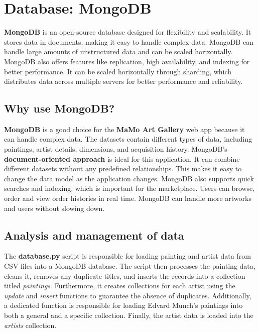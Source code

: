 \documentclass[a4paper,12pt]{article}
\begin{document}
\newpage
\section{Database: MongoDB}
\justify

\textbf{MongoDB} is an open-source database designed for flexibility and scalability. It stores data in documents, making it easy to handle complex data. MongoDB can handle large amounts of unstructured data and can be scaled horizontally. MongoDB also offers features like replication, high availability, and indexing for better performance. It can be scaled horizontally through sharding, which distributes data across multiple servers for better performance and reliability.


\subsection{Why use MongoDB?}
\justify
\textbf{MongoDB} is a good choice for the \textbf{MaMo Art Gallery} web app because it can handle complex data. The datasets contain different types of data, including paintings, artist details, dimensions, and acquisition history. MongoDB's \textbf{document-oriented approach} is ideal for this application. It can combine different datasets without any predefined relationships. This makes it easy to change the data model as the application changes.
MongoDB also supports quick searches and indexing, which is important for the marketplace. Users can browse, order and view order histories in real time. MongoDB can handle more artworks and users without slowing down.

\subsection{Analysis and management of data}
\justify

The \textbf{database.py} script is responsible for loading painting and artist data from CSV files into a MongoDB database. The script then processes the painting data, cleans it, removes any duplicate titles, and inserts the records into a collection titled \textit{paintings}. Furthermore, it creates collections for each artist using the \textit{update} and \textit{insert} functions to guarantee the absence of duplicates. Additionally, a dedicated function is responsible for loading Edvard Munch's paintings into both a general and a specific collection. Finally, the artist data is loaded into the \textit{artists} collection.
\end{document}
